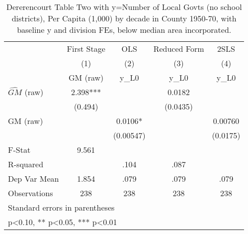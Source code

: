 \begin{table}[htbp]\centering
\def\sym#1{\ifmmode^{#1}\else\(^{#1}\)\fi}
\caption{Dererencourt Table Two with y=Number of Local Govts (no school districts), Per Capita (1,000) by decade in County 1950-70, with baseline y and division FEs, below median area incorporated.}
\begin{tabular}{l*{4}{c}}
\toprule
                    & First Stage   &         OLS   &Reduced Form   &        2SLS   \\
                    &\multicolumn{1}{c}{(1)}&\multicolumn{1}{c}{(2)}&\multicolumn{1}{c}{(3)}&\multicolumn{1}{c}{(4)}\\
                    &\multicolumn{1}{c}{GM  (raw)}&\multicolumn{1}{c}{y\_L0}&\multicolumn{1}{c}{y\_L0}&\multicolumn{1}{c}{y\_L0}\\
\midrule
$\hat{GM}$ (raw)    &       2.398***&               &      0.0182   &               \\
                    &     (0.494)   &               &    (0.0435)   &               \\
\addlinespace
GM  (raw)           &               &      0.0106*  &               &     0.00760   \\
                    &               &   (0.00547)   &               &    (0.0175)   \\
\midrule
F-Stat              &       9.561   &               &               &               \\
R-squared           &               &        .104   &        .087   &               \\
Dep Var Mean        &       1.854   &        .079   &        .079   &        .079   \\
Observations        &         238   &         238   &         238   &         238   \\
\bottomrule
\multicolumn{5}{l}{\footnotesize Standard errors in parentheses}\\
\multicolumn{5}{l}{\footnotesize * p<0.10, ** p<0.05, *** p<0.01}\\
\end{tabular}
\end{table}
